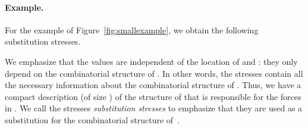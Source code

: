 \documentclass{article}
\theoremstyle{plain} \newtheorem{thm}{Theorem}[section]
\begin{document}
\paragraph{Example.}
For the example of Figure~\ref{fig:smallexample},
we obtain the following substitution stresses.








We emphasize that the  values are independent
of the location of  and : they only depend on the
combinatorial structure of . In other words, the stresses
 contain all the necessary information about the
combinatorial structure of . Thus, we have a compact
description (of size ) of the structure of  that 
is responsible
for the forces in . We call the stresses  \textit{substitution
  stresses} 
to emphasize that they are used
as a substitution for the combinatorial structure of~.
\end{document}
